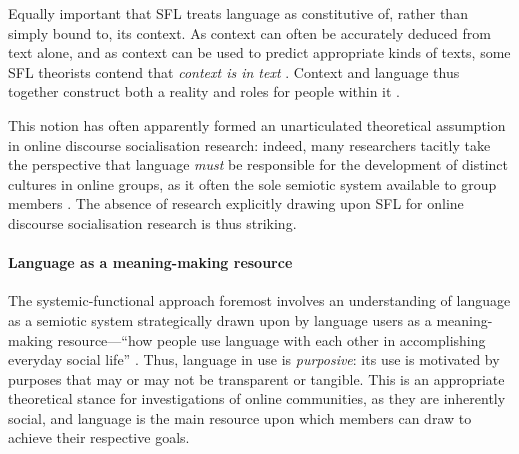 			Equally important that SFL treats language as constitutive of, rather than simply bound to, its context. As context can often be accurately deduced from text alone, and as context can be used to predict appropriate kinds of texts, some SFL theorists contend that \emph{context is in text} \cite[p.~7]{eggins_introduction_2004}. Context and language thus together construct both a reality and roles for people within it \cite{veel_learning_1997}.

			This notion has often apparently formed an unarticulated theoretical assumption in online discourse socialisation research: indeed, many researchers tacitly take the perspective that language \emph{must} be responsible for the development of distinct cultures in online groups, as it often the sole semiotic system available to group members \cite{thorne_computer-mediated_2008}. The absence of research explicitly drawing upon SFL for online discourse socialisation research is thus striking.

		 \paragraph{Language as a meaning-making resource}

			 The systemic-functional approach foremost involves an understanding of language as a semiotic system strategically drawn upon by language users as a meaning-making resource---``how people use language with each other in accomplishing everyday social life'' \cite[p.~2]{eggins_introduction_2004}. Thus, language in use is \emph{purposive}: its use is motivated by purposes that may or may not be transparent or tangible. This is an appropriate theoretical stance for investigations of online communities, as they are inherently social, and language is the main resource upon which members can draw to achieve their respective goals.






